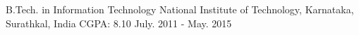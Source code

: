 \begin{cventries}
    \cventry
    {B.Tech. in Information Technology}
    {National Institute of Technology, Karnataka, Surathkal, India}
    {CGPA: 8.10}
    {July. 2011 - May. 2015}
    {}
\end{cventries}
